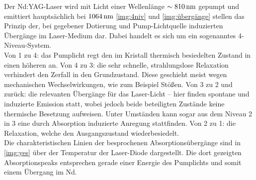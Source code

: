 \documentclass[numbers=noenddot,12pt,a4paper]{scrartcl}
\begin{document}
Der Nd:YAG-Laser wird mit Licht einer Wellenlänge $\sim\unit[810]{nm}$ gepumpt und emittiert hauptsächlich bei $\unit[1064]{nm}$ \ref{img:4niv} und \ref{img:übergänge} stellen das Prinzip der, bei gegebener Dotierung und Pump-Lichtquelle induzierten Übergänge im Laser-Medium dar. Dabei handelt es sich um ein sogenanntes 4-Niveau-System. \\
Von 1 zu 4: das Pumplicht regt den im Kristall thermisch besiedelten Zustand in einen höheren an. Von 4 zu 3: die sehr schnelle, strahlungslose Relaxation verhindert den Zerfall in den Grundzustand. Diese geschieht meist wegen mechanischen Wechselwirkungen, wie zum Beispiel Stößen. Von 3 zu 2 und zurück: die relevanten Übergänge für das Laser-Licht -- hier finden spontane und induzierte Emission statt, wobei jedoch beide beteiligten Zustände keine thermische Besetzung aufweisen. Unter Umständen kann sogar aus dem Niveau 2 in 3 eine durch Absorption induzierte Anregung stattfinden. Von 2 zu 1: die Relaxation, welche den Ausgangszustand wiederbesiedelt.\\
Die charakteristischen Linien der besprochenen Absorptionsübergänge sind in \ref{img:yes} über der Temperatur der Laser-Diode dargestellt. Die dort gezeigten Absorptionspeaks entsprechen gerade einer Energie des Pumplichts und somit einem Übergang im Nd.
\end{document}
